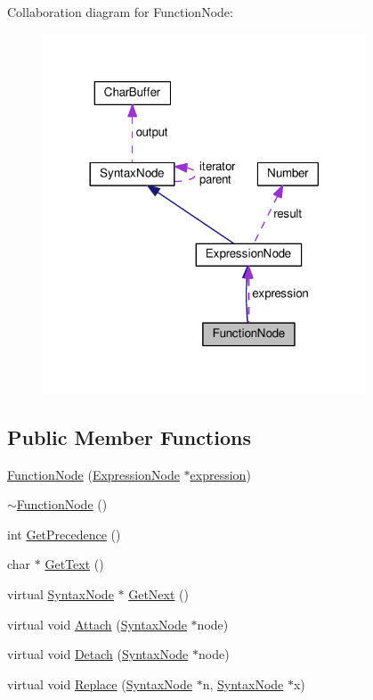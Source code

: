 Collaboration diagram for Function\+Node\+:\nopagebreak
\begin{figure}[H]
\begin{center}
\leavevmode
\includegraphics[width=272pt]{classFunctionNode__coll__graph}
\end{center}
\end{figure}
\subsection*{Public Member Functions}
\begin{DoxyCompactItemize}
\item 
\hyperlink{classFunctionNode_a41cb7db0162ffbec0902bd8ff7ea435f}{Function\+Node} (\hyperlink{classExpressionNode}{Expression\+Node} $\ast$\hyperlink{classFunctionNode_ad7577b179a1937aaf8a0058bb5b546dc}{expression})
\item 
\hyperlink{classFunctionNode_a24ca76ed6585311b7ee49534f11dbc78}{$\sim$\+Function\+Node} ()
\item 
int \hyperlink{classFunctionNode_a410288c74db880d2d3bffadc393d9ede}{Get\+Precedence} ()
\item 
char $\ast$ \hyperlink{classFunctionNode_a86b42caf0a4019d8f594dc994bb094e7}{Get\+Text} ()
\item 
virtual \hyperlink{classSyntaxNode}{Syntax\+Node} $\ast$ \hyperlink{classFunctionNode_a8f6d3631e6b06af048a87463f34f0b8e}{Get\+Next} ()
\item 
virtual void \hyperlink{classFunctionNode_aec646af849e98f7aee604398dccf1385}{Attach} (\hyperlink{classSyntaxNode}{Syntax\+Node} $\ast$node)
\item 
virtual void \hyperlink{classFunctionNode_a3af90509cddcec47bdf454665c622412}{Detach} (\hyperlink{classSyntaxNode}{Syntax\+Node} $\ast$node)
\item 
virtual void \hyperlink{classFunctionNode_a951101d50e4b4428871986923d5657d8}{Replace} (\hyperlink{classSyntaxNode}{Syntax\+Node} $\ast$n, \hyperlink{classSyntaxNode}{Syntax\+Node} $\ast$x)
\end{DoxyCompactItemize}
